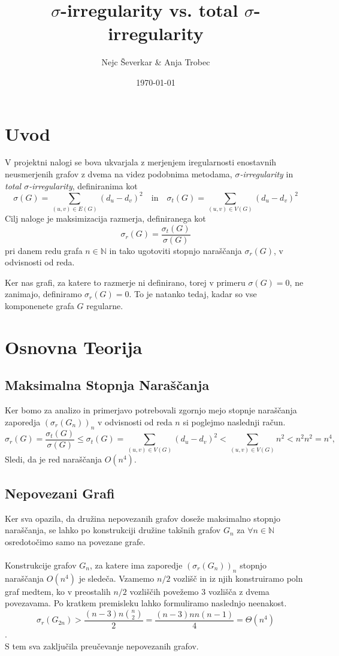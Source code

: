 \documentclass[ letterpaper, titlepage, fleqn]{article}
\begin{document}
\title{$\sigma$-irregularity vs. total $\sigma$-irregularity}
\author{Nejc Ševerkar \& Anja Trobec}
\date{\today}
\maketitle

\section{Uvod}
V projektni nalogi se bova ukvarjala z merjenjem iregularnosti enostavnih neusmerjenih grafov z
dvema na videz podobnima metodama, {\em $\sigma$-irregularity} in {\em total $\sigma$-irregularity},
definiranima kot 
$$
\sigma(G) = \sum_{(u, v) \in E(G)}(d_u - d_v)^2 
\quad \text{in} \quad
\sigma_t(G) = \sum_{(u, v) \in V(G)}(d_u - d_v)^2
$$
Cilj naloge je maksimizacija razmerja, definiranega kot 
$$\sigma_r(G) = \frac{\sigma_t(G)}{\sigma(G)}$$
pri danem redu grafa $n \in \mathbb{N}$ in tako ugotoviti 
stopnjo naraščanja $\sigma_r(G)$, v odvisnosti od reda.

Ker nas grafi, za katere to razmerje ni definirano,
torej v primeru $\sigma(G) = 0$, ne zanimajo, definiramo $\sigma_r(G) = 0$.
To je natanko tedaj, kadar so vse komponenete grafa $G$ regularne.

\section{Osnovna Teorija}

\subsection{Maksimalna Stopnja Naraščanja}
Ker bomo za analizo in primerjavo potrebovali zgornjo mejo stopnje naraščanja
zaporedja $(\sigma_r(G_n))_n$ v odvisnosti od reda $n$ si poglejmo 
naslednji račun.
$$
\sigma_r(G) = \frac{\sigma_t(G)}{\sigma(G)} 
\leq \sigma_t(G)
= \sum_{(u, v) \in V(G)}(d_u - d_v)^2 
< \sum_{(u, v) \in V(G)}n^2
< n^2  n^2 = n^4,
$$
Sledi, da je red naraščanja $O(n^4)$.

\subsection{Nepovezani Grafi}
Ker sva opazila, da družina nepovezanih grafov doseže maksimalno stopnjo naraščanja,
se lahko po konstrukciji družine takšnih grafov $G_n$ za $\forall n \in \mathbb{N}$
osredotočimo samo na povezane grafe.
\\\\
Konstrukcije grafov $G_n$, za katere ima zaporedje $(\sigma_r(G_n))_n$ stopnjo 
naraščanja $O(n^4)$ je sledeča.
Vzamemo $n / 2$ vozlišč in iz njih konstruiramo poln graf
medtem, ko v preostalih $n /2$ vozliščih povežemo 3 vozlišča z dvema povezavama.
Po kratkem premisleku lahko formuliramo naslednjo neenakost.
$$\sigma_r(G_{2n}) > \frac{(n - 3)n \binom{n}{2}}{2} = \frac{(n - 3)n n(n - 1)}{4} = \Theta(n^4)$$.
\\
S tem sva zaključila preučevanje nepovezanih grafov.
\end{document}
